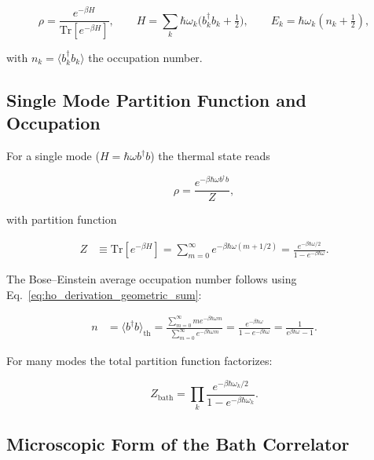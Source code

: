 \begin{equation} \label{eq:ho_gibbs_state}
	\rho = \frac{e^{-\beta H}}{\mathrm{Tr}[e^{-\beta H}]}, \qquad H=\sum_k \hbar \omega_k \Big(b_k^{\dagger} b_k + \tfrac{1}{2}\Big), \qquad E_k = \hbar \omega_k (n_k + \tfrac{1}{2}),
\end{equation}

\noindent
with $n_k = \langle b_k^{\dagger} b_k \rangle$ the occupation number.


\subsection{Single Mode Partition Function and Occupation}
\label{subsec:single_mode}

\noindent
For a single mode ($H=\hbar \omega b^{\dagger} b$) the thermal state reads

\begin{equation} \label{eq:ho_single_mode_density_matrix}
	\rho = \frac{e^{-\beta \hbar \omega b^{\dagger} b}}{Z},
\end{equation}

\noindent
with partition function

\begin{align} \label{eq:ho_partition_function}
	Z & \equiv \mathrm{Tr}[e^{-\beta H}] = \sum_{m=0}^{\infty} e^{-\beta \hbar \omega (m+1/2)} = \frac{e^{-\beta \hbar \omega/2}}{1 - e^{-\beta \hbar \omega}}.
\end{align}

\noindent
The Bose--Einstein average occupation number follows using Eq.~\eqref{eq:ho_derivation_geometric_sum}:

\begin{align} \label{eq:ho_expectation_number_operator}
	n & = \langle b^{\dagger} b \rangle_{\text{th}} = \frac{\sum_{m=0}^{\infty} m e^{-\beta \hbar \omega m}}{\sum_{m=0}^{\infty} e^{-\beta \hbar \omega m}} = \frac{e^{-\beta \hbar \omega}}{1-e^{-\beta \hbar \omega}} = \frac{1}{e^{\beta \hbar \omega}-1}.
\end{align}

\noindent
For many modes the total partition function factorizes:

\begin{equation} \label{eq:ho_generalized_partition_function}
	Z_{\text{bath}} = \prod_k \frac{e^{-\beta \hbar \omega_k /2}}{1 - e^{-\beta \hbar \omega_k}}.
\end{equation}


\subsection{Microscopic Form of the Bath Correlator}
\label{subsec:microscopic_bath_correlator}

